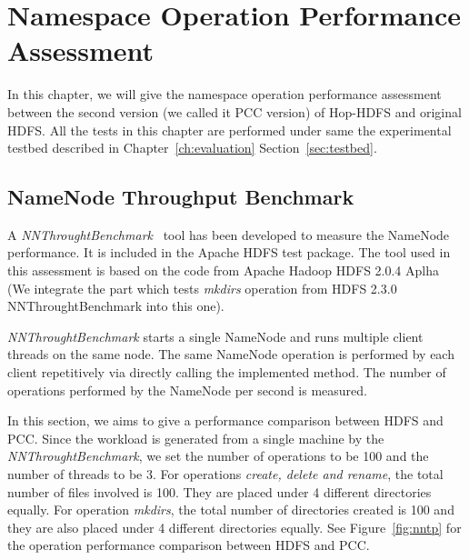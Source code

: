 
%
%
%


\chapter{Namespace Operation Performance Assessment}
\label{ch:Assessment}

 In this chapter, we will give the namespace operation performance assessment between the second version (we called it PCC version) of Hop-HDFS and original HDFS. All the tests in this chapter are performed under same the experimental testbed described in Chapter~\ref{ch:evaluation} Section~\ref{sec:testbed}.

\section{NameNode Throughput Benchmark}

A \textit{NNThroughtBenchmark}~\cite{shvachko2010hdfs} tool has been developed to measure the NameNode performance. It is included in the Apache HDFS test package. The tool used in this assessment is based on the code from Apache Hadoop HDFS 2.0.4 Aplha (We integrate the part which tests \textit{mkdirs} operation from HDFS 2.3.0 NNThroughtBenchmark into this one).

\noindent \textit{NNThroughtBenchmark} starts a single NameNode and runs multiple client threads on the same node.  The same NameNode operation is performed by each client repetitively via directly calling the implemented method. The number of operations performed by the NameNode per second is measured.

\noindent In this section, we aims to give a performance comparison between HDFS and PCC. Since the workload is generated from a single machine by the \textit{NNThroughtBenchmark}, we set the number of operations to be 100 and the number of threads to be 3. For operations \textit{create, delete and rename}, the total number of files involved is 100. They are placed under 4 different directories equally. For operation \textit{mkdirs}, the total number of directories created is 100 and they are also placed under 4 different directories equally. See Figure~\ref{fig:nntp} for the operation performance comparison between HDFS and PCC.

